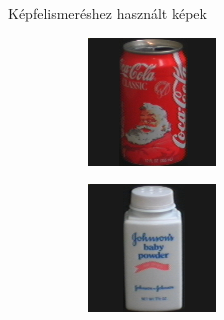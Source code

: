 \documentclass{beamer}
\begin{document}
\begin{frame}{Képfelismeréshez használt képek}
\begin{figure}
\begin{subfigure}{55pt}
        \end{subfigure}
        \begin{subfigure}{55pt}
            \centering
        \includegraphics[width=\textwidth]{figures/coil_original/62.png}
        
        \end{subfigure}
        \begin{subfigure}{55pt}
            \centering
        \includegraphics[width=\textwidth]{figures/coil_original/64.png}
        

\end{subfigure}
\end{figure}
\end{frame}
\end{document}

